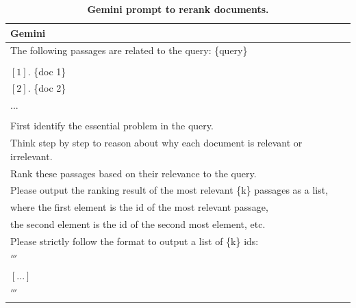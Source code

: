 \begin{table}[htbp]
\caption{\textbf{Gemini prompt to rerank documents.}}
\centering
\begin{tabular}{l}
\toprule
Gemini \\
\midrule
The following passages are related to the query: \{query\} \\
\\
$[1]$. \{doc 1\} \\
$[2]$. \{doc 2\} \\
... \\
 \\
First identify the essential problem in the query. \\
Think step by step to reason about why each document is relevant or irrelevant. \\
Rank these passages based on their relevance to the query. \\
Please output the ranking result of the most relevant \{k\} passages as a list, \\
where the first element is the id of the most relevant passage, \\
the second element is the id of the second most element, etc. \\
Please strictly follow the format to output a list of \{k\} ids: \\
$'''$ \\
$[...]$ \\
$'''$ \\
\bottomrule
\end{tabular}

\label{tab:rerank_prompts}
\end{table}
